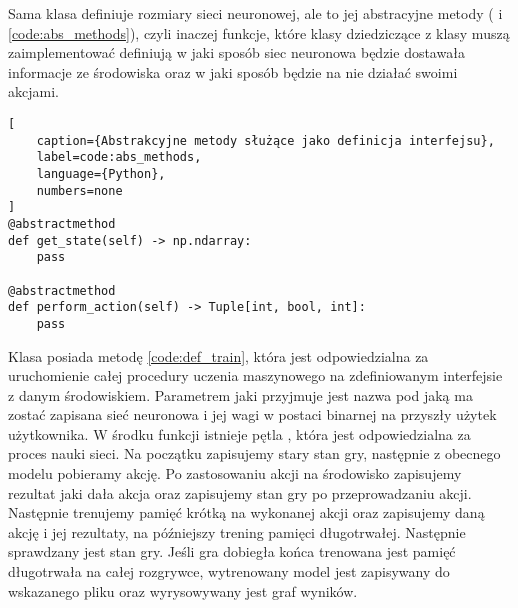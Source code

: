 Sama klasa definiuje rozmiary sieci neuronowej, ale to jej abstracyjne metody ( i  \ref{code:abs_methods}), czyli inaczej funkcje, które klasy dziedziczące z klasy  muszą zaimplementować definiują w jaki sposób siec neuronowa będzie dostawała informacje ze środowiska oraz w jaki sposób będzie na nie działać swoimi akcjami.

\begin{onepage}
    \begin{lstlisting}[
    caption={Abstrakcyjne metody służące jako definicja interfejsu},
    label=code:abs_methods,
    language={Python},
    numbers=none
]
@abstractmethod
def get_state(self) -> np.ndarray:
    pass

@abstractmethod
def perform_action(self) -> Tuple[int, bool, int]:
    pass
\end{lstlisting}
\end{onepage}

Klasa  posiada metodę  \ref{code:def_train}, która jest odpowiedzialna za uruchomienie całej procedury uczenia maszynowego na zdefiniowanym interfejsie z danym środowiskiem. Parametrem jaki przyjmuje jest nazwa pod jaką ma zostać zapisana sieć neuronowa i jej wagi w postaci binarnej na przyszły użytek użytkownika. W środku funkcji istnieje pętla , która jest odpowiedzialna za proces nauki sieci. Na początku zapisujemy stary stan gry, następnie z obecnego modelu pobieramy akcję. Po zastosowaniu akcji na środowisko zapisujemy rezultat jaki dała akcja oraz zapisujemy stan gry po przeprowadzaniu akcji. Następnie trenujemy pamięć krótką na wykonanej akcji oraz zapisujemy daną akcję i jej rezultaty, na późniejszy trening pamięci długotrwałej. Następnie sprawdzany jest stan gry. Jeśli gra dobiegła końca trenowana jest pamięć długotrwała na całej rozgrywce, wytrenowany model jest zapisywany do wskazanego pliku oraz wyrysowywany jest graf wyników.

